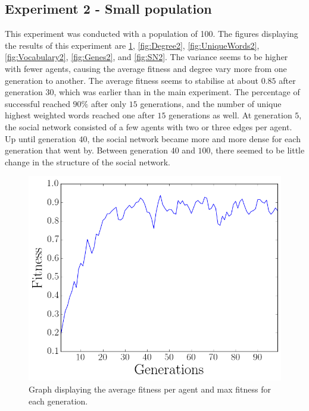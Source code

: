 \subsection{Experiment 2 - Small population}
This experiment was conducted with a population of 100. The figures displaying the results of this experiment are \ref{fig:Fitness2}, \ref{fig:Degree2}, \ref{fig:UniqueWords2}, \ref{fig:Vocabulary2}, \ref{fig:Genes2}, and \ref{fig:SN2}. The variance seems to be higher with fewer agents, causing the average fitness and degree vary more from one generation to another. The average fitness seems to stabilise at about $0.85$ after generation $30$, which was earlier than in the main experiment. The percentage of successful reached $90\%$ after only $15$ generations, and the number of unique highest weighted words reached one after $15$ generations as well. At generation $5$, the social network consisted of a few agents with two or three edges per agent. Up until generation $40$, the social network became more and more dense for each generation that went by. Between generation $40$ and $100$, there seemed to be little change in the structure of the social network.   
\begin{figure}[htbp]
    \centering
    \includegraphics[scale=0.5]{fig/Results/Exp2/Fitness1}
    \caption{Graph displaying the average fitness per agent and max fitness for each generation.}
    \label{fig:Fitness2}
\end{figure}
